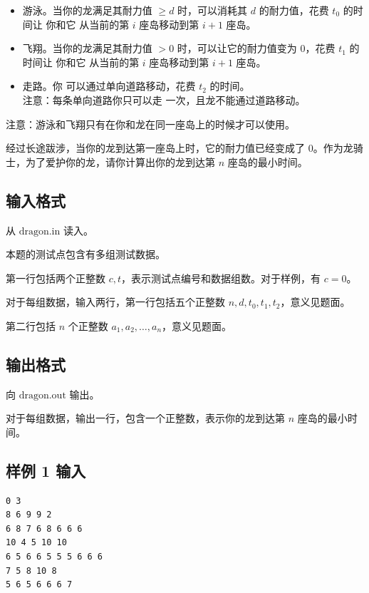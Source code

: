 \documentclass[12pt,a4paper,oneside]{ctexart}
\begin{document}
\begin{itemize}

\item 游泳。当你的龙满足其耐力值 $\geq d$ 时，可以消耗其 $d$ 的耐力值，花费 $t_{0}$ 的时间让 $\textbf{你和它}$ 从当前的第 $i$ 座岛移动到第 $i+1$ 座岛。

\item 飞翔。当你的龙满足其耐力值 $>0$ 时，可以让它的耐力值变为 $0$，花费 $t_{1}$ 的时间让 $\textbf{你和它}$ 从当前的第 $i$ 座岛移动到第 $i+1$ 座岛。

\item 走路。$\textbf{你}$ 可以通过单向道路移动，花费 $t_{2}$ 的时间。$\textbf{注意：每条单向道路你只可以走}$ $\textbf{一次，且龙不能通过道路移动。}$

\end{itemize}

$\textbf{注意：游泳和飞翔只有在你和龙在同一座岛上的时候才可以使用。}$

经过长途跋涉，当你的龙到达第一座岛上时，它的耐力值已经变成了 $0$。作为龙骑士，为了爱护你的龙，请你计算出你的龙到达第 $n$ 座岛的最小时间。

  \subsection*{输入格式}

从 $\text{dragon.in}$ 读入。

本题的测试点包含有多组测试数据。

第一行包括两个正整数 $c,t$，表示测试点编号和数据组数。对于样例，有 $c=0$。

对于每组数据，输入两行，第一行包括五个正整数 $n,d,t_0,t_1,t_2$，意义见题面。

第二行包括 $n$ 个正整数 $a_{1},a_{2},\dots,a_{n}$，意义见题面。

  \subsection*{输出格式}

向 $\text{dragon.out}$ 输出。

对于每组数据，输出一行，包含一个正整数，表示你的龙到达第 $n$ 座岛的最小时间。

  \subsection*{样例 1 输入}
  \begin{verbatim}
0 3
8 6 9 9 2
6 8 7 6 8 6 6 6 
10 4 5 10 10
6 5 6 6 5 5 5 6 6 6 
7 5 8 10 8
5 6 5 6 6 6 7 
\end{verbatim}
\end{document}
